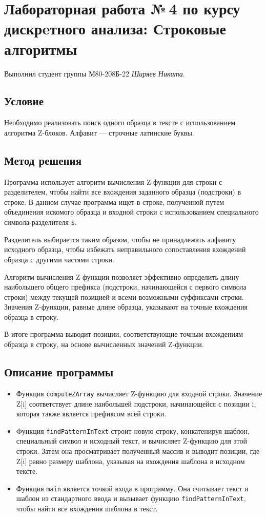 \documentclass[12pt]{article}
\begin{document}
\section*{Лабораторная работа №\,4 по курсу дискрeтного анализа: Строковые алгоритмы}
Выполнил студент группы М80-208Б-22 \textit{Ширяев Никита}.

\subsection*{Условие}

Необходимо реализовать поиск одного образца в тексте с использованием алгоритма Z-блоков. Алфавит — строчные латинские буквы. 

\subsection*{Метод решения}

Программа использует алгоритм вычисления Z-функции для строки с разделителем, чтобы найти все вхождения заданного образца (подстроки) в строке. В данном случае программа ищет в строке, полученной путем объединения искомого образца и входной строки с использованием специального символа-разделителя \texttt{\$}.

Разделитель выбирается таким образом, чтобы не принадлежать алфавиту исходного образца, чтобы избежать неправильного сопоставления вхождений образца с другими частями строки.

Алгоритм вычисления Z-функции позволяет эффективно определить длину наибольшего общего префикса (подстроки, начинающейся с первого символа строки) между текущей позицией и всеми возможными суффиксами строки. Значения Z-функции, равные длине образца, указывают на точные вхождения образца в строку.

В итоге программа выводит позиции, соответствующие точным вхождениям образца в строку, на основе вычисленных значений Z-функции.

\subsection*{Описание программы}
\begin{itemize}
\item Функция \texttt{computeZArray} вычисляет Z-функцию для входной строки. Значение Z[i] соответствует длине наибольшей подстроки, начинающейся с позиции i, которая также является префиксом всей строки.

\item Функция \texttt{findPatternInText} строит новую строку, конкатенируя шаблон, специальный символ и исходный текст, и вычисляет Z-функцию для этой строки. Затем она просматривает полученный массив и выводит позиции, где Z[i] равно размеру шаблона, указывая на вхождения шаблона в исходном тексте.

\item Функция \texttt{main} является точкой входа в программу. Она считывает текст и шаблон из стандартного ввода и вызывает функцию \texttt{findPatternInText}, чтобы найти все вхождения шаблона в текст.
\end{itemize}
\end{document}
